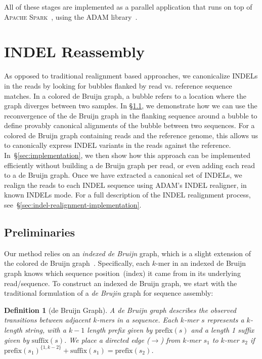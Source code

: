 \documentclass[phd]{ucbthesis}
\newtheorem{defn}{Definition}
\begin{document}
All of these stages are implemented as a parallel application that runs on top of
\textsc{Apache Spark}~\cite{zaharia10, zaharia12}, using the \textsc{ADAM}
library~\cite{massie13, nothaft15}.

\section{INDEL Reassembly}
\label{sec:indel-reassembly}

As opposed to traditional realignment based approaches, we canonicalize INDELs
in the reads by looking for bubbles flanked by read vs. reference sequence matches. In a colored de Bruijn
graph, a bubble refers to a location where the graph diverges between two
samples. In \S\ref{sec:formulation}, we demonstrate how we can use the
reconvergence of the de Bruijn graph in the flanking sequence around a bubble
to define provably canonical alignments of the bubble between two sequences.
For a colored de Bruijn graph containing reads and the reference genome, this
allows us to canonically express INDEL variants in the reads against the
reference. In~\S\ref{sec:implementation}, we then show how this approach
can be implemented efficiently without building a de Bruijn graph per read,
or even adding each read to a de Bruijn graph. Once we have extracted a
canonical set of INDELs, we realign the reads to each INDEL sequence using
\textsc{ADAM}'s INDEL realigner, in known INDELs mode. For a full description
of the INDEL realignment process, see~\S\ref{sec:indel-realignment-implementation}.

\subsection{Preliminaries}
\label{sec:formulation}

Our method relies on an \emph{indexed de Bruijn} graph, which is a slight
extension of the colored de Bruijn graph~\cite{iqbal12}. Specifically, each
$k$-mer in an indexed de Bruijn graph knows which sequence position~(index)
it came from in its underlying read/sequence. To construct an indexed de
Bruijn graph, we start with the traditional formulation of a \emph{de Brujin}
graph for sequence assembly:

\begin{defn}[de Bruijn Graph]
\label{defn:dbg}
A de Bruijn graph describes the observed transitions between adjacent $k$-mers in a sequence. Each
$k$-mer $s$ represents a $k$-length string, with a $k - 1$ length prefix given by $\text{prefix}(s)$ and a
length 1 suffix given by $\text{suffix}(s)$. We place a directed edge ($\rightarrow$) from $k$-mer $s_1$ to
$k$-mer $s_2$ if $\text{prefix}(s_1)^{\{1, k - 2\}} + \text{suffix}(s_1) = \text{prefix}(s_2)$.
\end{defn}
\end{document}
